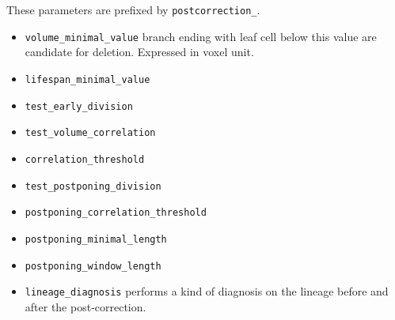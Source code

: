 These parameters are prefixed by \texttt{postcorrection\_}.

\begin{itemize}
\itemsep -0.5ex
\item \texttt{volume\_minimal\_value}
  branch ending with leaf cell below this value are candidate for deletion. Expressed in voxel unit.
\item \texttt{lifespan\_minimal\_value}
\item \texttt{test\_early\_division}
\item \texttt{test\_volume\_correlation}
\item \texttt{correlation\_threshold}
\item \texttt{test\_postponing\_division}
\item \texttt{postponing\_correlation\_threshold}
\item \texttt{postponing\_minimal\_length}
\item \texttt{postponing\_window\_length}
\item \texttt{lineage\_diagnosis}
  performs a kind of diagnosis on the lineage before and after the post-correction.
\end{itemize}





